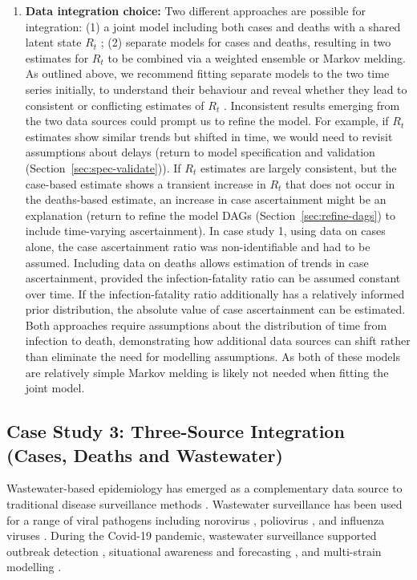 \documentclass{article}
\begin{document}
\begin{enumerate}
    \item \textbf{Data integration choice:} 
       Two different approaches are possible for integration: (1) a joint model including both cases and deaths with a shared latent state $R_t$ \citep{scott2020epidemia}; (2) separate models for cases and deaths, resulting in two estimates for $R_t$ to be combined via a weighted ensemble or Markov melding.
        As outlined above, we recommend fitting separate models to the two time series initially, to understand their behaviour and reveal whether they lead to consistent or conflicting estimates of $R_t$ \citep{sherratt2021exploring}. Inconsistent results emerging from the two data sources could prompt us to refine the model. For example, if $R_t$ estimates show similar trends but shifted in time, we would need to revisit assumptions about delays (return to model specification and validation (Section~\ref{sec:spec-validate})). If $R_t$ estimates are largely consistent, but the case-based estimate shows a transient increase in $R_t$ that does not occur in the deaths-based estimate, an increase in case ascertainment might be an explanation (return to refine the model \ac{DAG}s (Section~\ref{sec:refine-dags}) to include time-varying ascertainment). In case study 1, using data on cases alone, the case ascertainment ratio was non-identifiable and had to be assumed. Including data on deaths allows estimation of trends in case ascertainment, provided the infection-fatality ratio can be assumed constant over time. If the infection-fatality ratio additionally has a relatively informed prior distribution, the absolute value of case ascertainment can be estimated. Both approaches require assumptions about the distribution of time from infection to death, demonstrating how additional data sources can shift rather than eliminate the need for modelling assumptions. As both of these models are relatively simple Markov melding is likely not needed when fitting the joint model.
\end{enumerate}

\subsection{Case Study 3: Three-Source Integration (Cases, Deaths and Wastewater)}

Wastewater-based epidemiology has emerged as a complementary data source to traditional disease surveillance methods \citep{keshaviah2023wastewater}. Wastewater surveillance has been used for a range of viral pathogens including norovirus \citep{zheng2024tracking}, poliovirus \citep{whitehouse2024wastewater}, and influenza viruses \citep{zheng2023development}. During the Covid-19 pandemic, wastewater surveillance supported outbreak detection \citep{hewitt2022sensitivity}, situational awareness and forecasting \citep{varkila2023use,jin2024combining}, and multi-strain modelling \citep{dreifuss2025estimated}. 
\end{document}

